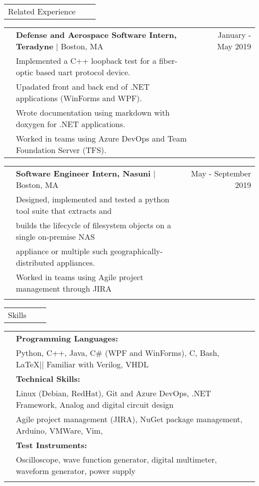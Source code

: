\documentclass[letterpaper,10pt,oneside]{article}
\begin{document}
\noindent \begin{tabularx}{\linewidth}{@{} l l R }
     \Large{Related Experience}\\
\end{tabularx}

\noindent \begin{tabularx}{\linewidth}{@{} l l R }
     & \textbf{Defense and Aerospace Software Intern, Teradyne} $\mid$ Boston, MA & January - May 2019 \\
     & Implemented a C++ loopback test for a fiber-optic based uart protocol device.\\
     & Upadated front and back end of .NET applications (WinForms and WPF).\\
     & Wrote documentation using markdown with doxygen for .NET applications.\\
     & Worked in teams using Azure DevOps and Team Foundation Server (TFS).\\
\end {tabularx}

\noindent \begin{tabularx}{\linewidth}{@{} l l R }
     & \textbf{Software Engineer Intern, Nasuni} $\mid$ Boston, MA & May - September 2019 \\
     & Designed, implemented and tested a python tool suite that extracts and\\
     & \indent builds the lifecycle of filesystem objects on a single on-premise NAS\\
     & \indent appliance or multiple such geographically-distributed appliances.\\
     & Worked in teams using Agile project management through JIRA\\
     \\
\end{tabularx}

 \noindent \begin{tabularx}{\linewidth}{@{} l l R } 
     \Large{Skills}\\
 \end{tabularx}
 \noindent \begin{tabularx}{\linewidth}{@{} l l l }
     &\textbf{Programming Languages:}\\
     &Python, C++, Java, C\# (WPF and WinForms), C, Bash, \LaTeX || Familiar with Verilog, VHDL  \\
     &\textbf{Technical Skills:}\\
     &Linux (Debian, RedHat), Git and Azure DevOps, .NET Framework, Analog and digital circuit design\\
     &Agile project management (JIRA), NuGet package management, Arduino, VMWare, Vim,\\
     &\textbf{Test Instruments:}\\
     &Oscilloscope, wave function generator, digital multimeter, waveform generator, power supply\\
     \\
 \end{tabularx}
\end{document}
